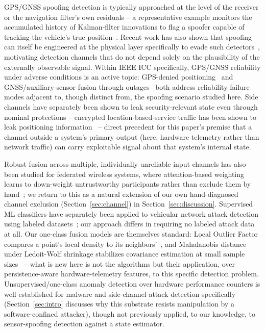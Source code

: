 \documentclass[conference]{IEEEtran}
\begin{document}
GPS/GNSS spoofing detection is typically approached at the level of the receiver or the navigation filter's own residuals -- a representative example monitors the accumulated history of Kalman-filter innovations to flag a spoofer capable of tracking the vehicle's true position~\cite{tanil2016kfins}. Recent work has also shown that spoofing can itself be engineered at the physical layer specifically to evade such detectors~\cite{yao2025physicalspoofing}, motivating detection channels that do not depend solely on the plausibility of the externally observable signal. Within IEEE ICC specifically, GPS/GNSS reliability under adverse conditions is an active topic: GPS-denied positioning~\cite{tsikteris2025pioneer} and GNSS/auxiliary-sensor fusion through outages~\cite{qmul2026gnssdas} both address reliability failure modes adjacent to, though distinct from, the spoofing scenario studied here. Side channels have separately been shown to leak security-relevant state even through nominal protections -- encrypted location-based-service traffic has been shown to leak positioning information~\cite{leaking2025lbs} -- direct precedent for this paper's premise that a channel outside a system's primary output (here, hardware telemetry rather than network traffic) can carry exploitable signal about that system's internal state.

Robust fusion across multiple, individually unreliable input channels has also been studied for federated wireless systems, where attention-based weighting learns to down-weight untrustworthy participants rather than exclude them by hand~\cite{zhang2024federated}; we return to this as a natural extension of our own hand-diagnosed channel exclusion (Section~\ref{sec:channel}) in Section~\ref{sec:discussion}. Supervised ML classifiers have separately been applied to vehicular network attack detection using labeled datasets~\cite{qian2024vanet}; our approach differs in requiring no labeled attack data at all. Our one-class fusion models are themselves standard: Local Outlier Factor compares a point's local density to its neighbors'~\cite{breunig2000lof}, and Mahalanobis distance under Ledoit-Wolf shrinkage stabilizes covariance estimation at small sample sizes~\cite{ledoitwolf2004} -- what is new here is not the algorithms but their application, over persistence-aware hardware-telemetry features, to this specific detection problem. Unsupervised/one-class anomaly detection over hardware performance counters is well established for malware and side-channel-attack detection specifically~\cite{demme2013feasibility,carna2023fight} (Section~\ref{sec:intro} discusses why this substrate resists manipulation by a software-confined attacker), though not previously applied, to our knowledge, to sensor-spoofing detection against a state estimator.
\end{document}
